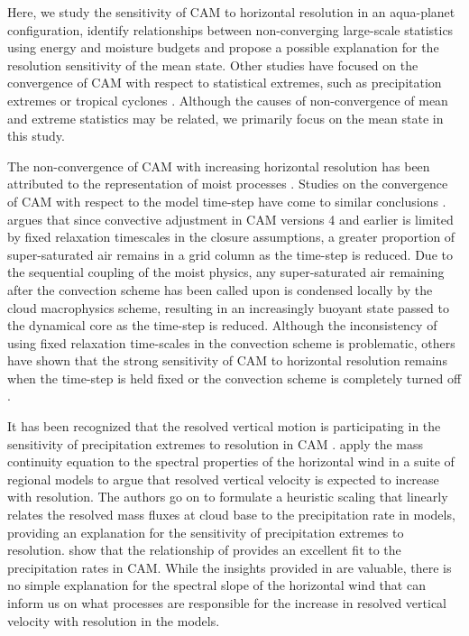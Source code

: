 Here, we study the sensitivity of CAM to horizontal resolution in an aqua-planet configuration, identify relationships between non-converging large-scale statistics using energy and moisture budgets and propose a possible explanation for the resolution sensitivity of the mean state. Other studies have focused on the convergence of CAM with respect to statistical extremes, such as precipitation extremes \citep{W2008TELLUS,LETAL2011TELLUS,YETAL2014JCLIM,OETAL2016JAMES} or tropical cyclones \citep{RJ2011JAMES}. Although the causes of non-convergence of mean and extreme statistics may be related, we primarily focus on the mean state in this study.

The non-convergence of CAM with increasing horizontal resolution has been attributed to the representation of moist processes \citep{W1999T,W2008TELLUS,OETAL2013JCLIM}. Studies on the convergence of CAM with respect to the model time-step have come to similar conclusions \citep{WO2003QJR,W2008TELLUS,W2013QJRMS,WETAL2015JAMES}. \cite{W2013QJRMS} argues that since convective adjustment in CAM versions 4 and earlier is limited by fixed relaxation timescales in the closure assumptions, a greater proportion of super-saturated air remains in a grid column as the time-step is reduced. Due to the sequential coupling of the moist physics, any super-saturated air remaining after the convection scheme has been called upon is condensed locally by the cloud macrophysics scheme, resulting in an increasingly buoyant state passed to the dynamical core as the time-step is reduced. Although the inconsistency of using fixed relaxation time-scales in the convection scheme is problematic, others have shown that the strong sensitivity of CAM to horizontal resolution remains when the time-step is held fixed \citep{W2008TELLUS,OETAL2013JCLIM,RETAL2013JCLIM} or the convection scheme is completely turned off \citep{OETAL2013JCLIM}. 

It has been recognized that the resolved vertical motion is participating in the sensitivity of precipitation extremes to resolution in CAM \citep{LETAL2011TELLUS,YETAL2014JCLIM}. \cite{RETAL2016CD} apply the mass continuity equation to the spectral properties of the horizontal wind in a suite of regional models to argue that resolved vertical velocity is expected to increase with resolution. The authors go on to formulate a heuristic scaling that linearly relates the resolved mass fluxes at cloud base to the precipitation rate in models, providing an explanation for the sensitivity of precipitation extremes to resolution. \cite{OETAL2016JAMES} show that the relationship of \cite{RETAL2016CD} provides an excellent fit to the precipitation rates in CAM. While the insights provided in \cite{RETAL2016CD} are valuable, there is no simple explanation for the spectral slope of the horizontal wind that can inform us on what processes are responsible for the increase in resolved vertical velocity with resolution in the models.

